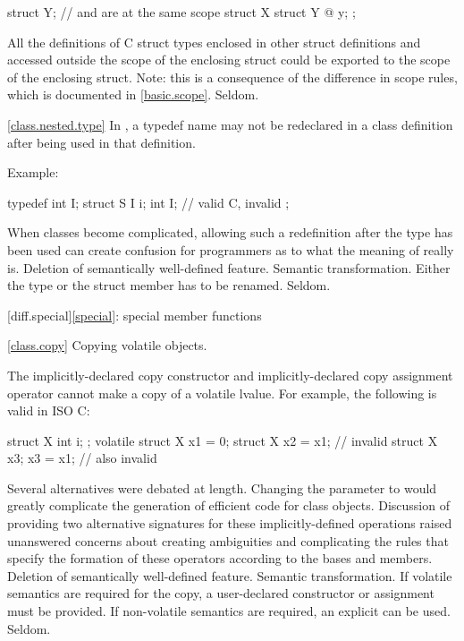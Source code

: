 \begin{codeblock}
struct Y;                       //  and  are at the same scope
struct X {
  struct Y { @\commentellip@ } y;
};
\end{codeblock}

All the definitions of C struct types enclosed in other struct
definitions and accessed outside the scope of the enclosing
struct could be exported to the scope of the enclosing struct.
Note: this is a consequence of the difference in scope rules,
which is documented in \ref{basic.scope}.
\howwide
Seldom.

\ref{class.nested.type}
\change In \Cpp, a typedef name may not be redeclared in a class definition after being used in that definition.

Example:

\begin{codeblock}
typedef int I;
struct S {
  I i;
  int I;                  // valid C, invalid \Cpp
};
\end{codeblock}
\rationale
When classes become complicated, allowing such a redefinition
after the type has been used can create confusion for \Cpp
programmers as to what the meaning of  really is.
\effect
Deletion of semantically well-defined feature.
\difficulty
Semantic transformation.
Either the type or the struct member has to be renamed.
\howwide
Seldom.

[diff.special]{\ref{special}: special member functions}

\ref{class.copy}
\change Copying volatile objects.

The implicitly-declared copy constructor and
implicitly-declared copy assignment operator
cannot make a copy of a volatile lvalue.
For example, the following is valid in ISO C:

\begin{codeblock}
struct X { int i; };
volatile struct X x1 = {0};
struct X x2 = x1;               // invalid \Cpp
struct X x3;
x3 = x1;                        // also invalid \Cpp
\end{codeblock}

\rationale
Several alternatives were debated at length.
Changing the parameter to
would greatly complicate the generation of
efficient code for class objects.
Discussion of
providing two alternative signatures for these
implicitly-defined operations raised
unanswered concerns about creating
ambiguities and complicating
the rules that specify the formation of
these operators according to the bases and
members.
\effect
Deletion of semantically well-defined feature.
\difficulty
Semantic transformation.
If volatile semantics are required for the copy,
a user-declared constructor or assignment must
be provided.
If non-volatile semantics are required,
an explicit
can be used.
\howwide
Seldom.

